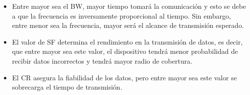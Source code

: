 \begin{itemize}
	\item Entre mayor sea el BW, mayor tiempo tomará la comunicación y esto se debe a que la frecuencia es inversamente proporcional al tiempo. Sin embargo, entre menor sea la frecuencia, mayor será el alcance de transmisión esperado.
	 \item El valor de SF determina el rendimiento en la transmisión de datos, es decir, que entre mayor sea este valor, el dispositivo tendrá menor probabilidad de recibir datos incorrectos y tendrá mayor radio de cobertura.
	 \item El CR asegura la fiabilidad de los datos, pero entre mayor sea este valor se sobrecarga el tiempo de transmisión.
\end{itemize}                                

